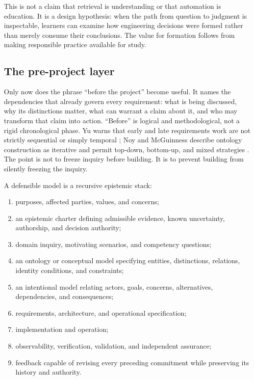 \documentclass[10pt,a4paper]{article}
\begin{document}
This is not a claim that retrieval is understanding or that automation is education. It is a design hypothesis: when the path from question to judgment is inspectable, learners can examine how engineering decisions were formed rather than merely consume their conclusions. The value for formation follows from making responsible practice available for study.

\subsection{The pre-project layer}

Only now does the phrase ``before the project'' become useful. It names the dependencies that already govern every requirement: what is being discussed, why its distinctions matter, what can warrant a claim about it, and who may transform that claim into action. ``Before'' is logical and methodological, not a rigid chronological phase. Yu warns that early and late requirements work are not strictly sequential or simply temporal \cite{yu1997}; Noy and McGuinness describe ontology construction as iterative and permit top-down, bottom-up, and mixed strategies \cite{noy2001}. The point is not to freeze inquiry before building. It is to prevent building from silently freezing the inquiry.

A defensible model is a recursive epistemic stack:

\begin{enumerate}
  \item purposes, affected parties, values, and concerns;
  \item an epistemic charter defining admissible evidence, known uncertainty, authorship, and decision authority;
  \item domain inquiry, motivating scenarios, and competency questions;
  \item an ontology or conceptual model specifying entities, distinctions, relations, identity conditions, and constraints;
  \item an intentional model relating actors, goals, concerns, alternatives, dependencies, and consequences;
  \item requirements, architecture, and operational specification;
  \item implementation and operation;
  \item observability, verification, validation, and independent assurance;
  \item feedback capable of revising every preceding commitment while preserving its history and authority.
\end{enumerate}
\end{document}

